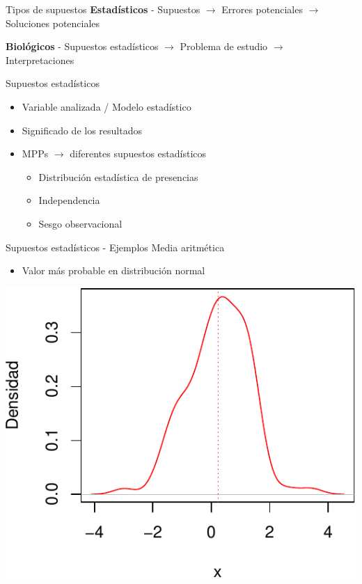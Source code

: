 \documentclass[
  11pt,
  ignorenonframetext,
]{beamer}
\providecommand{\tightlist}{%
  \setlength{\itemsep}{0pt}\setlength{\parskip}{0pt}}
\begin{document}
\begin{frame}{Tipos de supuestos}
\protect\hypertarget{tipos-de-supuestos}{}
\textbf{Estadísticos} - Supuestos \(\rightarrow\) Errores potenciales
\(\rightarrow\) Soluciones potenciales

\textbf{Biológicos} - Supuestos estadísticos \(\rightarrow\) Problema de
estudio \(\rightarrow\) Interpretaciones
\end{frame}

\begin{frame}{Supuestos estadísticos}
\protect\hypertarget{supuestos-estaduxedsticos}{}
\begin{itemize}
\item
  Variable analizada / Modelo estadístico
\item
  Significado de los resultados
\item
  MPPs \(\rightarrow\) diferentes supuestos estadísticos

  \begin{itemize}
  \tightlist
  \item
    Distribución estadística de presencias
  \item
    Independencia
  \item
    Sesgo observacional
  \end{itemize}
\end{itemize}
\end{frame}

\begin{frame}{Supuestos estadísticos - Ejemplos}
\protect\hypertarget{supuestos-estaduxedsticos---ejemplos}{}
Media aritmética

\begin{itemize}
\tightlist
\item
  Valor más probable en distribución normal
\end{itemize}

\begin{center}\includegraphics{Particularidades_files/figure-beamer/unnamed-chunk-2-1} \end{center}
\end{frame}
\end{document}
